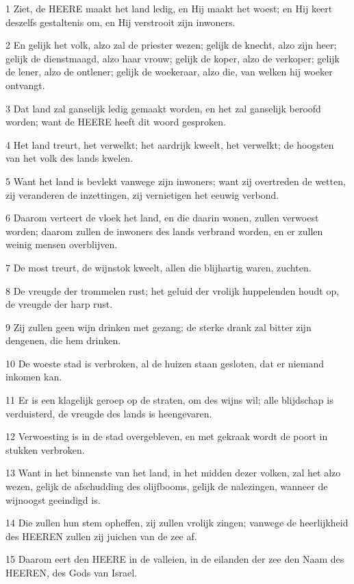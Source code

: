 \par 1 Ziet, de HEERE maakt het land ledig, en Hij maakt het woest; en Hij keert deszelfs gestaltenis om, en Hij verstrooit zijn inwoners.
\par 2 En gelijk het volk, alzo zal de priester wezen; gelijk de knecht, alzo zijn heer; gelijk de dienstmaagd, alzo haar vrouw; gelijk de koper, alzo de verkoper; gelijk de lener, alzo de ontlener; gelijk de woekeraar, alzo die, van welken hij woeker ontvangt.
\par 3 Dat land zal ganselijk ledig gemaakt worden, en het zal ganselijk beroofd worden; want de HEERE heeft dit woord gesproken.
\par 4 Het land treurt, het verwelkt; het aardrijk kweelt, het verwelkt; de hoogsten van het volk des lands kwelen.
\par 5 Want het land is bevlekt vanwege zijn inwoners; want zij overtreden de wetten, zij veranderen de inzettingen, zij vernietigen het eeuwig verbond.
\par 6 Daarom verteert de vloek het land, en die daarin wonen, zullen verwoest worden; daarom zullen de inwoners des lands verbrand worden, en er zullen weinig mensen overblijven.
\par 7 De most treurt, de wijnstok kweelt, allen die blijhartig waren, zuchten.
\par 8 De vreugde der trommelen rust; het geluid der vrolijk huppelenden houdt op, de vreugde der harp rust.
\par 9 Zij zullen geen wijn drinken met gezang; de sterke drank zal bitter zijn dengenen, die hem drinken.
\par 10 De woeste stad is verbroken, al de huizen staan gesloten, dat er niemand inkomen kan.
\par 11 Er is een klagelijk geroep op de straten, om des wijns wil; alle blijdschap is verduisterd, de vreugde des lands is heengevaren.
\par 12 Verwoesting is in de stad overgebleven, en met gekraak wordt de poort in stukken verbroken.
\par 13 Want in het binnenste van het land, in het midden dezer volken, zal het alzo wezen, gelijk de afschudding des olijfbooms, gelijk de nalezingen, wanneer de wijnoogst geeindigd is.
\par 14 Die zullen hun stem opheffen, zij zullen vrolijk zingen; vanwege de heerlijkheid des HEEREN zullen zij juichen van de zee af.
\par 15 Daarom eert den HEERE in de valleien, in de eilanden der zee den Naam des HEEREN, des Gods van Israel.
